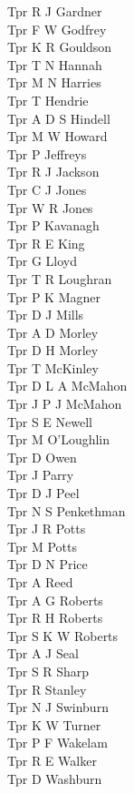 \begin{multicols}{2}
  Tpr R J Gardner \\
  Tpr F W Godfrey \\
  Tpr K R Gouldson \\
  Tpr T N Hannah \\
  Tpr M N Harries \\
  Tpr T Hendrie \\
  Tpr A D S Hindell \\
  Tpr M W Howard \\
  Tpr P Jeffreys \\
  Tpr R J Jackson \\
  Tpr C J Jones \\
  Tpr W R Jones \\
  Tpr P Kavanagh \\
  Tpr R E King \\
  Tpr G Lloyd \\
  Tpr T R Loughran \\
  Tpr P K Magner \\
  Tpr D J Mills \\
  Tpr A D Morley \\
  Tpr D H Morley \\
  Tpr T McKinley \\
  Tpr D L A McMahon \\
  Tpr J P J McMahon \\
  Tpr S E Newell \\
  Tpr M O'Loughlin \\
  Tpr D Owen \\
  Tpr J Parry \\
  Tpr D J Peel \\
  Tpr N S Penkethman \\
  Tpr J R Potts \\
  Tpr M Potts \\
  Tpr D N Price \\
  Tpr A Reed \\
  Tpr A G Roberts \\
  Tpr R H Roberts \\
  Tpr S K W Roberts \\
  Tpr A J Seal \\
  Tpr S R Sharp \\
  Tpr R Stanley \\
  Tpr N J Swinburn \\
  Tpr K W Turner \\
  Tpr P F Wakelam \\
  Tpr R E Walker \\
  Tpr D Washburn \\

\end{multicols}
